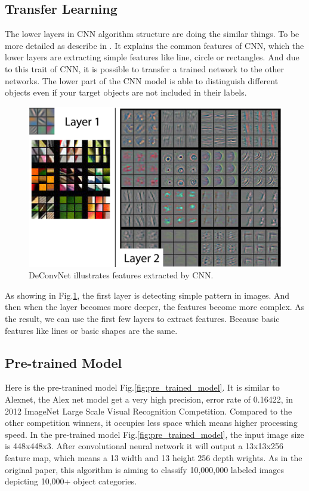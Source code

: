 \documentclass[senior]{IPSstyle}
\begin{document}
\subsection{Transfer Learning}\label{cha: transfer learning}
The lower layers in CNN algorithm structure are doing the similar things.
To be more detailed as describe in \cite{noh2015learning}.
It explains the common features of CNN, which the lower layers are extracting simple features like line, circle or rectangles.
And due to this trait of CNN, it is possible to transfer a trained network to the other networks.
The lower part of the CNN model is able to distinguish different objects even if your target objects are not included in their labels. 
\begin{figure}
    \centering
    \includegraphics[width=15cm]{MasterThesis-master/images/deconv.png}
    \caption{DeConvNet illustrates features extracted by CNN.}
    \label{fig:deconv}
\end{figure}

As showing in Fig.\ref{fig:deconv}, the first layer is detecting simple pattern in images.
And then when the layer becomes more deeper, the features become more complex.
As the result, we can use the first few layers to extract features.
Because basic features like lines or basic shapes are the same.

\subsection{Pre-trained Model}
Here is the pre-tranined model Fig.\ref{fig:pre_trained_model}.
It is similar to Alexnet\cite{krizhevsky2012imagenet}, the Alex net model get a very high precision, error rate of 0.16422, in 2012  ImageNet Large Scale Visual Recognition Competition.
Compared to the other competition winners, it occupies less space which means higher processing speed.
In the pre-trained model Fig.\ref{fig:pre_trained_model}, the input image size is 448x448x3.
After convolutional neural network it will output a 13x13x256 feature map, which means a 13 width and 13 height 256 depth wrights.
As in the original paper, this algorithm is aiming to classify 10,000,000 labeled images depicting 10,000+ object categories\cite{ILSVRC15}.
\end{document}
